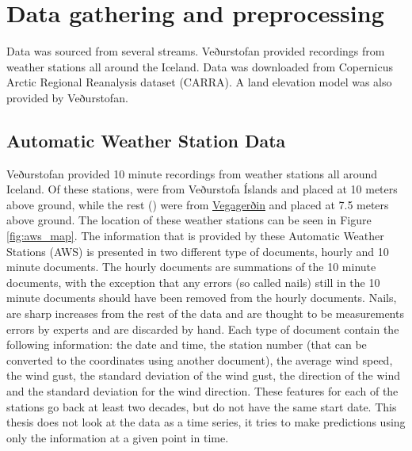 
\chapter{Data gathering and preprocessing} %

\label{Chapter2} %


Data was sourced from several streams. Veðurstofan provided recordings from weather stations all around the Iceland. Data was downloaded from Copernicus Arctic Regional Reanalysis dataset (CARRA). A land elevation model was also provided by Veðurstofan.

\section{Automatic Weather Station Data}

Veðurstofan provided 10 minute recordings from \nStationsMin weather stations all around Iceland. Of these \nStationsMin stations, \nVedurMin were from Veðurstofa Íslands and placed at 10 meters above ground, while the rest (\nVGMin) were from \href{https://www.vegagerdin.is/}{Vegagerðin} and placed at 7.5 meters above ground. The location of these weather stations can be seen in Figure \ref{fig:aws_map}. The information that is provided by these Automatic Weather Stations (AWS) is presented in two different type of documents, hourly and 10 minute documents. The hourly documents are summations of the 10 minute documents, with the exception that any errors (so called nails) still in the 10 minute documents should have been removed from the hourly documents. Nails, are sharp increases from the rest of the data and are thought to be measurements errors by experts and are discarded by hand. Each type of document contain the following information: the date and time, the station number (that can be converted to the coordinates using another document), the average wind speed, the wind gust, the standard deviation of the wind gust, the direction of the wind and the standard deviation for the wind direction. These features for each of the stations go back at least two decades, but do not have the same start date. This thesis does not look at the data as a time series, it tries to make predictions using only the information at a given point in time.

